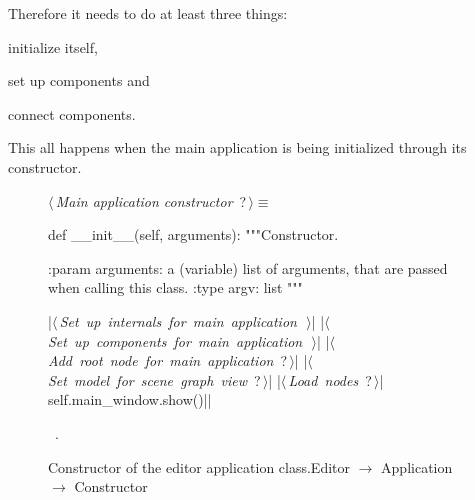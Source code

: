 \documentclass[%
    a4paper,    %
    justified,  %
    nobib,      %
    openany     %
]{tufte-book}
\begin{document}
Therefore it needs to do at least three things:
\begin{enumerate*}
  \item initialize itself,
  \item set up components and
  \item connect components.
  \end{enumerate*}
This all happens when the main application is being initialized through its
constructor.

\begin{figure}[h]
\begin{flushleft} \small
\begin{minipage}{\linewidth}\label{scrap13}\raggedright\small
{} $\langle\,${\itshape Main application constructor}\nobreak\ {\footnotesize {?}}$\,\rangle\equiv$
\vspace{-1ex}
\begin{pythoncode}
def __init__(self, arguments):
    """Constructor.

    :param arguments: a (variable) list of arguments, that are
                      passed when calling this class.
    :type  argv:      list
    """

    |\hbox{$\langle\,${\itshape Set up internals for main application}\nobreak\ {\footnotesize {}}$\,\rangle$}|
    |\hbox{$\langle\,${\itshape Set up components for main application}\nobreak\ {\footnotesize {}}$\,\rangle$}|
    |\hbox{$\langle\,${\itshape Add root node for main application}\nobreak\ {\footnotesize ?}$\,\rangle$}|
    |\hbox{$\langle\,${\itshape Set model for scene graph view}\nobreak\ {\footnotesize ?}$\,\rangle$}|
    |\hbox{$\langle\,${\itshape Load nodes}\nobreak\ {\footnotesize ?}$\,\rangle$}|
    self.main_window.show()|\NWsep|
\end{pythoncode}
\vspace{1.5ex}
\footnotesize
\begin{list}{}{\setlength{\itemsep}{-\parsep}\setlength{\itemindent}{-\leftmargin}}
\item \NWtxtMacroRefIn\ .

\item{}
\end{list}
\end{minipage}\vspace{4ex}
\end{flushleft}
\caption{Constructor of the editor application
    class.\newline{}\newline{}Editor $\rightarrow$ Application $\rightarrow$
    Constructor} \label{editor:lst:app:constructor}
\end{figure}
\end{document}
